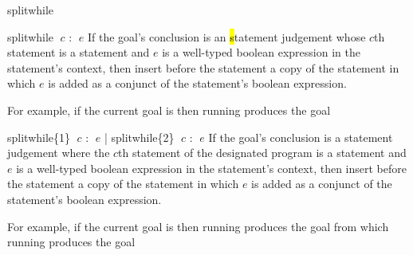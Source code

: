 \begin{tactic}{splitwhile}
  \begin{tsyntax}{splitwhile $\;c$ : $\;e$}
    If the goal's conclusion is an \hl statement judgement whose $c$th
    statement is a  statement and $e$ is a well-typed
    boolean expression in the  statement's context, then
    insert before the  statement a copy of the 
    statement in which $e$ is added as a conjunct of the statement's
    boolean expression.

    \medskip For example, if the current goal is
     then
    running 
    produces the goal
  \end{tsyntax}

  \begin{tsyntax}{splitwhile\{1\} $\;c$ : $\;e$ | splitwhile\{2\} $\;c$ : $\;e$}
    If the goal's conclusion is a \prhl statement judgement where the
    $c$th statement of the designated program is a 
    statement and $e$ is a well-typed boolean expression in the
     statement's context, then insert before the 
    statement a copy of the  statement in which $e$ is added
    as a conjunct of the statement's boolean expression.

    \medskip For example, if the current goal is
     then
    running 
    produces the goal
    from which
    running 
    produces the goal
  \end{tsyntax}
\end{tactic}
